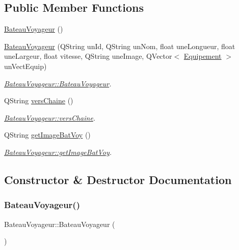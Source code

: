 \subsection*{Public Member Functions}
\begin{DoxyCompactItemize}
\item 
\hyperlink{class_bateau_voyageur_ac327b0101a2586190a3afcd639f146cc}{Bateau\+Voyageur} ()
\item 
\hyperlink{class_bateau_voyageur_ad23d17c60d5aaa25ae2a1304782aae4c}{Bateau\+Voyageur} (Q\+String un\+Id, Q\+String un\+Nom, float une\+Longueur, float une\+Largeur, float vitesse, Q\+String une\+Image, Q\+Vector$<$ \hyperlink{class_equipement}{Equipement} $>$ un\+Vect\+Equip)
\begin{DoxyCompactList}\small\item\em \hyperlink{class_bateau_voyageur_ac327b0101a2586190a3afcd639f146cc}{Bateau\+Voyageur\+::\+Bateau\+Voyageur}. \end{DoxyCompactList}\item 
Q\+String \hyperlink{class_bateau_voyageur_a3fa14cf7db3a1a35457f1e0450d7e8b2}{vers\+Chaine} ()
\begin{DoxyCompactList}\small\item\em \hyperlink{class_bateau_voyageur_a3fa14cf7db3a1a35457f1e0450d7e8b2}{Bateau\+Voyageur\+::vers\+Chaine}. \end{DoxyCompactList}\item 
Q\+String \hyperlink{class_bateau_voyageur_a3154786b2f572d0c2a2ac975757295eb}{get\+Image\+Bat\+Voy} ()
\begin{DoxyCompactList}\small\item\em \hyperlink{class_bateau_voyageur_a3154786b2f572d0c2a2ac975757295eb}{Bateau\+Voyageur\+::get\+Image\+Bat\+Voy}. \end{DoxyCompactList}\end{DoxyCompactItemize}


\subsection{Constructor \& Destructor Documentation}
\mbox{\label{class_bateau_voyageur_ac327b0101a2586190a3afcd639f146cc}} 
\subsubsection{\texorpdfstring{Bateau\+Voyageur()}{BateauVoyageur()}\hspace{0.1cm}{\footnotesize\ttfamily [1/2]}}
{\footnotesize\ttfamily Bateau\+Voyageur\+::\+Bateau\+Voyageur (\begin{DoxyParamCaption}{ }\end{DoxyParamCaption})}

